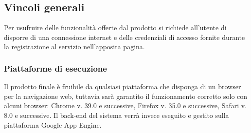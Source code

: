 \subsection{Vincoli generali}
Per usufruire delle funzionalità offerte dal prodotto si richiede all'utente di disporre
di una connessione internet e delle credenziali di accesso fornite durante la registrazione al servizio nell'apposita pagina.

\subsubsection{Piattaforme di esecuzione}
Il prodotto finale è fruibile da qualsiasi piattaforma che disponga di un browser per la navigazione web, tuttavia sarà garantito il funzionamento corretto solo con alcuni browser: Chrome v. 39.0 e successive, Firefox v. 35.0 e successive, Safari v. 8.0 e successive.
Il back-end del sistema verrà invece eseguito e gestito sulla piattaforma Google App Engine.
